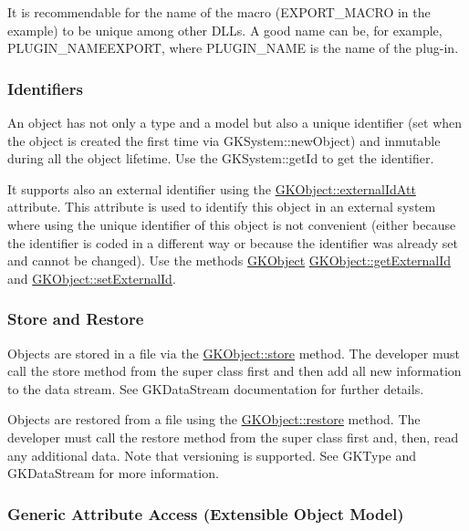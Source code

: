 It is recommendable for the name of the macro (E\+X\+P\+O\+R\+T\+\_\+\+M\+A\+C\+RO in the example) to be unique among other D\+L\+Ls. A good name can be, for example, P\+L\+U\+G\+I\+N\+\_\+\+N\+A\+M\+E\+E\+X\+P\+O\+RT, where P\+L\+U\+G\+I\+N\+\_\+\+N\+A\+ME is the name of the plug-\/in.

\subsubsection*{Identifiers}

An object has not only a type and a model but also a unique identifier (set when the object is created the first time via G\+K\+System\+::new\+Object) and inmutable during all the object lifetime. Use the G\+K\+System\+::get\+Id to get the identifier.

It supports also an external identifier using the \hyperlink{classGKBaseObject_a8287b7ae2c1c41363d3ad44dfc53190a}{G\+K\+Object\+::external\+Id\+Att} attribute. This attribute is used to identify this object in an external system where using the unique identifier of this object is not convenient (either because the identifier is coded in a different way or because the identifier was already set and cannot be changed). Use the methods \hyperlink{classGKObject}{G\+K\+Object} \hyperlink{classGKObject_a2b17cb85e8c403b4a91b223bf5f776de}{G\+K\+Object\+::get\+External\+Id} and \hyperlink{classGKObject_a6ac40f8daaae90b1c39de6ce738376ee}{G\+K\+Object\+::set\+External\+Id}.

\subsubsection*{Store and Restore}

Objects are stored in a file via the \hyperlink{classGKObject_a81a2e8cee6d6d6d59ab57683310732ea}{G\+K\+Object\+::store} method. The developer must call the store method from the super class first and then add all new information to the data stream. See G\+K\+Data\+Stream documentation for further details.

Objects are restored from a file using the \hyperlink{classGKObject_a94de210200c6b594d903984ba1bb55d9}{G\+K\+Object\+::restore} method. The developer must call the restore method from the super class first and, then, read any additional data. Note that versioning is supported. See G\+K\+Type and G\+K\+Data\+Stream for more information.

\subsubsection*{Generic Attribute Access (Extensible Object Model)}

